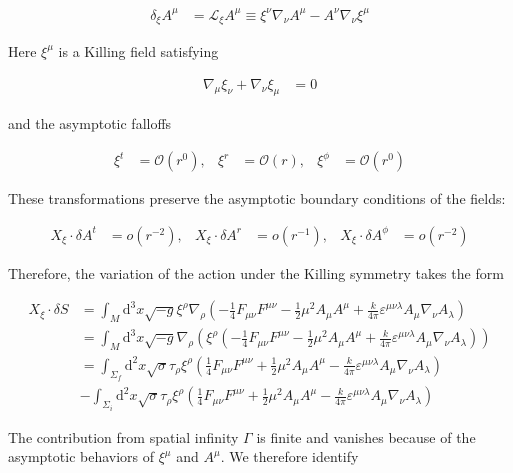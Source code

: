 \begin{align}
\delta _{\xi}A^{\mu} & =\mathcal{L}_\xi A^{\mu} \equiv \xi^\nu \nabla_\nu A^\mu - A^\nu \nabla_\nu \xi^\mu
\end{align}

Here $\xi ^{\mu}$ is a Killing field satisfying

\begin{align}
\nabla _{\mu}\xi _{\nu}+\nabla _{\nu}\xi _{\mu} & =0
\end{align}

and the asymptotic falloffs

\begin{align}
\xi ^{t} & =\mathcal{O}(r^{0}), & \xi ^{r} & =\mathcal{O}(r), & \xi ^{\phi} & =\mathcal{O}(r^{0})
\end{align}

These transformations preserve the asymptotic boundary conditions of the fields:

\begin{align}
X_{\xi}\cdot \delta A^{t} & =o(r^{-2}), & X_{\xi}\cdot \delta A^{r} & =o(r^{-1}), & X_{\xi}\cdot \delta A^{\phi} & =o(r^{-2})
\end{align}

Therefore, the variation of the action under the Killing symmetry takes the form

\begin{align}
X_{\xi}\cdot \delta S & =\int _{M}\mathrm{d}^{3}x\sqrt{ -g }\xi ^{\rho}\nabla _{\rho}\left(-\frac{1}{4}F_{\mu \nu}F^{\mu \nu}-\frac{1}{2}\mu ^{2}A_{\mu}A^{\mu}+\frac{k}{4\pi}\varepsilon^{\mu \nu \lambda}A_{\mu}\nabla _{\nu}A_{\lambda}\right) \\
 & =\int _{M}\mathrm{d}^{3}x\sqrt{ -g }\nabla _{\rho}\left(\xi ^{\rho}\left(-\frac{1}{4}F_{\mu \nu}F^{\mu \nu}-\frac{1}{2}\mu ^{2}A_{\mu}A^{\mu}+\frac{k}{4\pi}\varepsilon^{\mu \nu \lambda}A_{\mu}\nabla _{\nu}A_{\lambda}\right)\right) \\
 & =\int _{\Sigma _{f}}\mathrm{d}^{2}x\sqrt{ \sigma }\tau _{\rho}\xi ^{\rho}\left(\frac{1}{4}F_{\mu \nu}F^{\mu \nu}+\frac{1}{2}\mu ^{2}A_{\mu}A^{\mu}-\frac{k}{4\pi}\varepsilon ^{\mu \nu \lambda}A_{\mu}\nabla _{\nu}A_{\lambda}\right) \\
 & -\int _{\Sigma _{i}}\mathrm{d}^{2}x\sqrt{ \sigma }\tau _{\rho}\xi ^{\rho}\left(\frac{1}{4}F_{\mu \nu}F^{\mu \nu}+\frac{1}{2}\mu ^{2}A_{\mu}A^{\mu}-\frac{k}{4\pi}\varepsilon ^{\mu \nu \lambda}A_{\mu}\nabla _{\nu}A_{\lambda}\right)
\end{align}

The contribution from spatial infinity $\Gamma$ is finite and vanishes because of the asymptotic behaviors of $\xi ^{\mu}$ and $A^{\mu}$. We therefore identify

